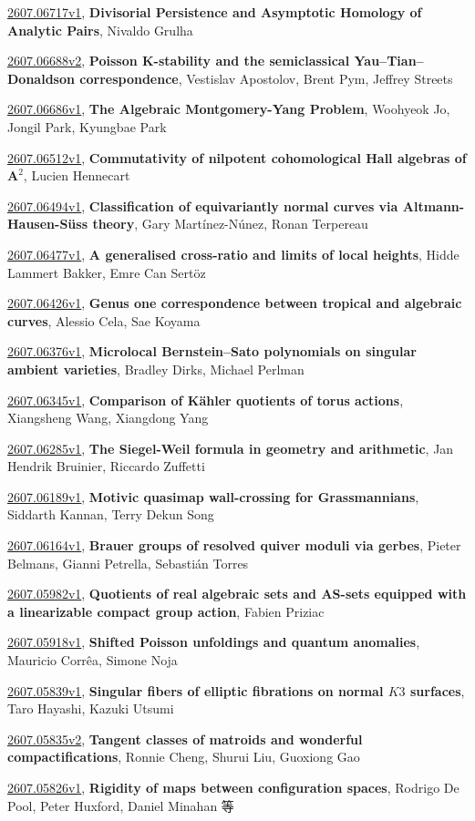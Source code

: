\documentclass[9pt, a4paper]{article}
\theoremstyle{plain}
\theoremstyle{definition}
\theoremstyle{remark}
\newcommand{\arxiv}[3]{\href{https://arxiv.org/abs/#1}{#1}, \textbf{\textcolor{arxivblue}{#2}}, #3}
\begin{document}
\arxiv{2607.06717v1}{Divisorial Persistence and Asymptotic Homology of Analytic Pairs}{Nivaldo Grulha}

\arxiv{2607.06688v2}{Poisson K-stability and the semiclassical Yau--Tian--Donaldson correspondence}{Vestislav Apostolov, Brent Pym, Jeffrey Streets}

\arxiv{2607.06686v1}{The Algebraic Montgomery-Yang Problem}{Woohyeok Jo, Jongil Park, Kyungbae Park}

\arxiv{2607.06512v1}{Commutativity of nilpotent cohomological Hall algebras of $\mathbf{A}^2$}{Lucien Hennecart}

\arxiv{2607.06494v1}{Classification of equivariantly normal curves via Altmann-Hausen-Süss theory}{Gary Martínez-Núnez, Ronan Terpereau}

\arxiv{2607.06477v1}{A generalised cross-ratio and limits of local heights}{Hidde Lammert Bakker, Emre Can Sertöz}

\arxiv{2607.06426v1}{Genus one correspondence between tropical and algebraic curves}{Alessio Cela, Sae Koyama}

\arxiv{2607.06376v1}{Microlocal Bernstein--Sato polynomials on singular ambient varieties}{Bradley Dirks, Michael Perlman}

\arxiv{2607.06345v1}{Comparison of Kähler quotients of torus actions}{Xiangsheng Wang, Xiangdong Yang}

\arxiv{2607.06285v1}{The Siegel-Weil formula in geometry and arithmetic}{Jan Hendrik Bruinier, Riccardo Zuffetti}

\arxiv{2607.06189v1}{Motivic quasimap wall-crossing for Grassmannians}{Siddarth Kannan, Terry Dekun Song}

\arxiv{2607.06164v1}{Brauer groups of resolved quiver moduli via gerbes}{Pieter Belmans, Gianni Petrella, Sebastián Torres}

\arxiv{2607.05982v1}{Quotients of real algebraic sets and AS-sets equipped with a linearizable compact group action}{Fabien Priziac}

\arxiv{2607.05918v1}{Shifted Poisson unfoldings and quantum anomalies}{Mauricio Corrêa, Simone Noja}

\arxiv{2607.05839v1}{Singular fibers of elliptic fibrations on normal $K3$ surfaces}{Taro Hayashi, Kazuki Utsumi}

\arxiv{2607.05835v2}{Tangent classes of matroids and wonderful compactifications}{Ronnie Cheng, Shurui Liu, Guoxiong Gao}

\arxiv{2607.05826v1}{Rigidity of maps between configuration spaces}{Rodrigo De Pool, Peter Huxford, Daniel Minahan 等}
\end{document}
